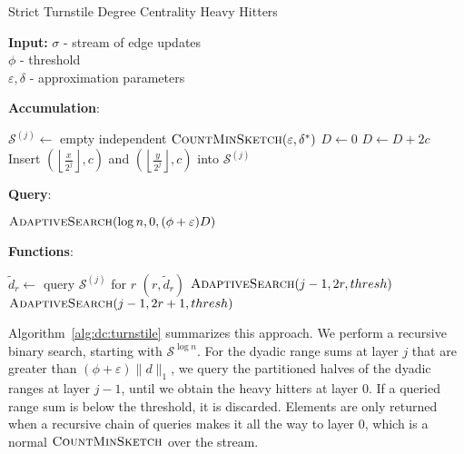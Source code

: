 \documentclass{report}
\newcommand{\algoname}[1]{\textnormal{\textsc{#1}}}
\begin{document}
\begin{algorithm}[htbp] 
\caption{Strict Turnstile Degree Centrality Heavy Hitters}\label{alg:dc:turnstile}
\begin{flushleft}
        \textbf{Input:} 		$\sigma$ - stream of edge updates\\
        	\hspace{3.2em}	$\phi$ - threshold\\
        	\hspace{3.2em}	$\varepsilon, \delta$ - approximation parameters\\
\end{flushleft}
\textbf{Accumulation}:
\begin{algorithmic}[1]
		\State $\mathcal{S}^{(j)} \gets $ empty independent $\algoname{CountMinSketch}(\varepsilon, \delta^*)$
	\EndFor
	\State $D \gets 0$
		\State $D \gets D + 2c$
			\State Insert $\left ( \left \lfloor \frac{x}{2^j} \right \rfloor, c \right )$ and $\left ( \left \lfloor \frac{y}{2^j} \right \rfloor, c \right )$ into $\mathcal{S}^{(j)}$
		\EndFor
	\EndFor
\end{algorithmic}
\textbf{Query}:
\begin{algorithmic}[1]
	\State \Return $\algoname{AdaptiveSearch}(\log n, 0, (\phi + \varepsilon) D)$
\end{algorithmic}
\textbf{Functions}:
\begin{algorithmic}[1]
		\State $\widetilde{d}_r \gets $ query $\mathcal{S}^{(j)}$ for $r$
				\State \Return $(r, \widetilde{d}_r)$
			\Else 
				\State $\algoname{AdaptiveSearch}(j - 1, 2r, thresh)$
				\State $\algoname{AdaptiveSearch}(j - 1, 2r + 1, thresh)$
			\EndIf
		\EndIf
	\EndFunction
\end{algorithmic}
\end{algorithm}

Algorithm~\ref{alg:dc:turnstile} summarizes this approach.
We perform a recursive binary search, starting with $\mathcal{S}^{\log n}$.
For the dyadic range sums at layer $j$ that are greater than $(\phi + \varepsilon) \|d\|_1$, we query the partitioned halves of the dyadic ranges at layer $j-1$, until we obtain the heavy hitters at layer $0$.  
If a queried range sum is below the threshold, it is discarded. 
Elements are only returned when a recursive chain of queries makes it all the way to layer $0$, which is a normal $\algoname{CountMinSketch}$ over the stream.
\end{document}
